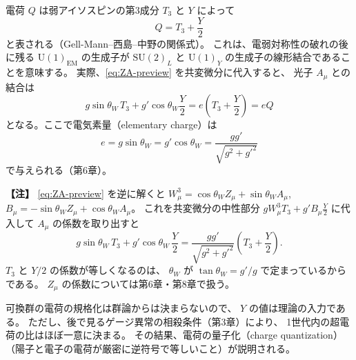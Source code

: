 \documentclass[uplatex,dvipdfmx,a4paper,11pt,openany]{jsbook}
\newcommand{\en}[1]{（#1）}
\newenvironment{note}{\vspace{1ex}\par\footnotesize\noindent\textbf{【注】}}{\par\vspace{1ex}}
\numberwithin{equation}{chapter}
\theoremstyle{definition}
\theoremstyle{plain}
\theoremstyle{remark}
\newcommand{\SU}{\mathrm{SU}}
\newcommand{\U}{\mathrm{U}}
\begin{document}
電荷 $Q$ は弱アイソスピンの第3成分 $T_3$ と $Y$ によって
\begin{equation}
\boxed{
Q=T_3+\frac{Y}{2}
}
\label{eq:GNN}
\end{equation}
と表される（Gell-Mann--西島--中野の関係式）。
これは、電弱対称性の破れの後に残る $\U(1)_{\mathrm{EM}}$ の生成子が
$\SU(2)_L$ と $\U(1)_Y$ の生成子の線形結合であることを意味する。
実際、\eqref{eq:ZA-preview} を共変微分に代入すると、
光子 $A_\mu$ との結合は
\begin{equation}
g\sin\theta_W\,T_3+g'\cos\theta_W\frac{Y}{2}
=e\left(T_3+\frac Y2\right)=eQ
\end{equation}
となる。ここで電気素量\en{elementary charge}は
\begin{equation}
e=g\sin\theta_W=g'\cos\theta_W
=\frac{gg'}{\sqrt{g^2+g'^2}}
\label{eq:e-preview}
\end{equation}
で与えられる（第6章）。
\begin{note}
\eqref{eq:ZA-preview} を逆に解くと
$W^3_\mu=\cos\theta_WZ_\mu+\sin\theta_WA_\mu$,
$B_\mu=-\sin\theta_WZ_\mu+\cos\theta_WA_\mu$。
これを共変微分の中性部分 $gW^3_\mu T_3+g'B_\mu\frac Y2$ に代入して $A_\mu$ の係数を取り出すと
\[
g\sin\theta_W\,T_3+g'\cos\theta_W\,\frac Y2
=\frac{gg'}{\sqrt{g^2+g'^2}}\left(T_3+\frac Y2\right).
\]
$T_3$ と $Y/2$ の係数が等しくなるのは、
$\theta_W$ が $\tan\theta_W=g'/g$ で定まっているからである。
$Z_\mu$ の係数については第6章・第8章で扱う。
\end{note}
可換群の電荷の規格化は群論からは決まらないので、
$Y$ の値は理論の入力である。
ただし、後で見るゲージ異常の相殺条件（第3章）により、
1世代内の超電荷の比はほぼ一意に決まる。
その結果、電荷の量子化\en{charge quantization}（陽子と電子の電荷が厳密に逆符号で等しいこと）が説明される。
\end{document}
